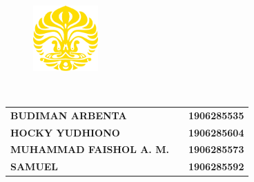 %

%
%

\begin{titlepage}
    \begin{center}
        \begin{figure}
            \begin{center}
                \includegraphics[width=2.5cm]{assets/pics/makara_kuning.png}
            \end{center}
        \end{figure}
        \vspace*{0cm}

        \vspace*{1.0cm}
        \bo{\Judul} \\[1.0cm]

        \vspace*{2.5 cm}
        \bo{\Type}

        \vspace*{2 cm}

            \begin{table}[H]\centering
\begin{tabular}{llr}
\textbf{BUDIMAN ARBENTA}                  &  & \textbf{1906285535} \\
\textbf{HOCKY YUDHIONO}                   &  & \textbf{1906285604} \\
\textbf{MUHAMMAD FAISHOL A. M.} &  & \textbf{1906285573} \\
\textbf{SAMUEL}                           &  & \textbf{1906285592}
        \end{tabular}
        \end{table}

        \vspace*{5.0cm}

    \end{center}
\end{titlepage}
